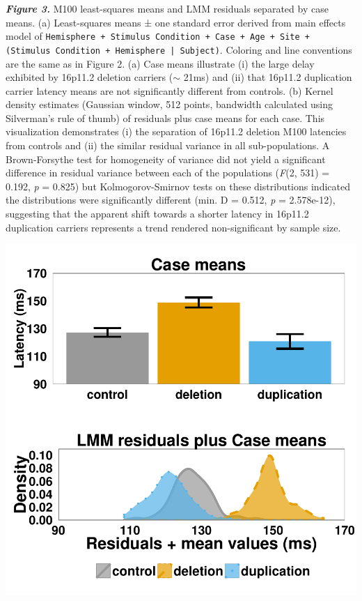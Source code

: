 \documentclass{article}
\begin{document}
\textbf{\emph{Figure 3.}} M100 least-squares means and LMM residuals separated by case means. (a) Least-squares means ± one standard error derived from main effects model of \texttt{Hemisphere + Stimulus Condition + Case + Age + Site + (Stimulus Condition + Hemisphere | Subject)}. Coloring and line conventions are the same as in Figure 2. (a) Case means illustrate (i) the large delay exhibited by 16p11.2 deletion carriers ($\sim$ 21ms) and (ii) that 16p11.2 duplication carrier latency means are not significantly different from controls. (b) Kernel density estimates (Gaussian window, 512 points, bandwidth calculated using Silverman’s rule of thumb) of residuals plus case means for each case. This visualization demonstrates (i) the separation of 16p11.2 deletion M100 latencies from controls and (ii) the similar residual variance in all sub-populations.  A Brown-Forsythe test for homogeneity of variance did not yield a significant difference in residual variance between each of the populations (\emph{F}(2, 531) = 0.192, \emph{p} = 0.825) but Kolmogorov-Smirnov tests on these distributions indicated the distributions were significantly different (min. D = 0.512, \emph{p} = 2.578e-12), suggesting that the apparent shift towards a shorter latency in 16p11.2 duplication carriers represents a trend rendered non-significant by sample size.

\begin{center}
\includegraphics{m100-text-working-copy-003}

\end{center}
\end{document}
